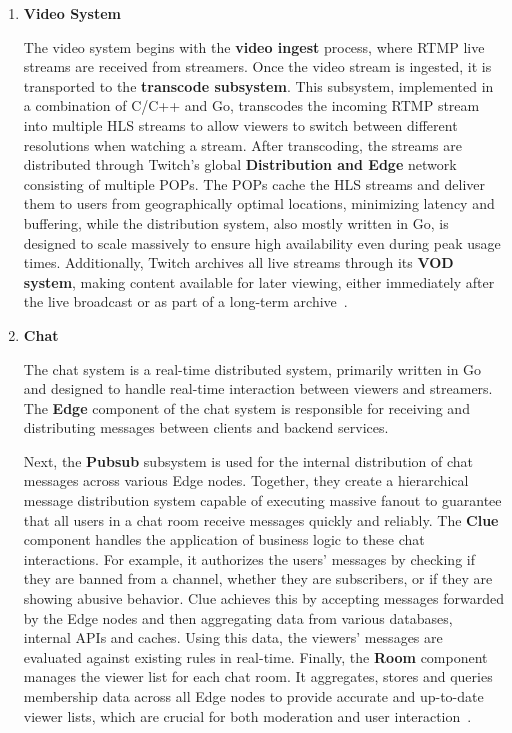 \begin{enumerate}
    \item \textbf{Video System}
    
    The video system begins with the \textbf{video ingest} process, where \ac{RTMP} live streams are received from streamers. Once the video stream is ingested, it is transported to the \textbf{transcode subsystem}. 
    This subsystem, implemented in a combination of C/C++ and Go, transcodes the incoming \ac{RTMP} stream into multiple \ac{HLS} streams to allow viewers to switch between different resolutions when watching a stream.
    After transcoding, the streams are distributed through Twitch's global \textbf{Distribution and Edge} network consisting of multiple \ac{POPs}. The \ac{POPs} cache the \ac{HLS} streams and deliver them to users from geographically optimal locations, minimizing latency and buffering, while the distribution system, also mostly written in Go, is designed to scale massively to ensure high availability even during peak usage times.
    Additionally, Twitch archives all live streams through its \textbf{\ac{VOD} system}, making content available for later viewing, either immediately after the live broadcast or as part of a long-term archive~\parencite{twitch_engineering}.
    
    \item \textbf{Chat}

    The chat system is a real-time distributed system, primarily written in Go and designed to handle real-time interaction between viewers and streamers. The \textbf{Edge} component of the chat system is responsible for receiving and distributing messages between clients and backend services.
    
    Next, the \textbf{Pubsub} subsystem is used for the internal distribution of chat messages across various Edge nodes. Together, they create a hierarchical message distribution system capable of executing massive fanout to guarantee that all users in a chat room receive messages quickly and reliably. The \textbf{Clue} component handles the application of business logic to these chat interactions. For example, it authorizes the users' messages by checking if they are banned from a channel, whether they are subscribers, or if they are showing abusive behavior. Clue achieves this by accepting messages forwarded by the Edge nodes and then aggregating data from various databases, internal \ac{API}s and caches. Using this data, the viewers' messages are evaluated against existing rules in real-time. Finally, the \textbf{Room} component manages the viewer list for each chat room. It aggregates, stores and queries membership data across all Edge nodes to provide accurate and up-to-date viewer lists, which are crucial for both moderation and user interaction~\parencite{twitch_chat}.


\end{enumerate}
